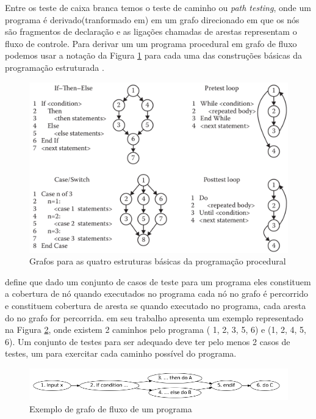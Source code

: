 \documentclass[dm,ppgcomp]{texfurg} %
\begin{document}
Entre os teste de caixa branca temos o teste de caminho ou \textit{path testing}, onde um programa é derivado(tranformado em) em um grafo direcionado em que os nós são fragmentos de declaração e as ligações chamadas de arestas representam o fluxo de controle. Para derivar um um programa procedural em grafo de fluxo podemos usar a notação da Figura \ref{fig:4estrutura_basica} para cada uma das construções básicas da programação estruturada \cite{jorgensen2016software}.

\begin{figure}[ht]
\centering
\includegraphics[scale=0.3]{imagens/const_basica_grafo.png}
\caption{Grafos para as quatro estruturas básicas da programação procedural}
\label{fig:4estrutura_basica}
\end{figure}

\cite{jorgensen2016software} define que dado um conjunto de casos de teste para um programa eles constituem a cobertura de nó quando executados no programa cada nó no grafo é percorrido e constituem cobertura de aresta se quando executado no programa, cada aresta do no grafo for percorrida. \cite{winikoff2014testability} em seu trabalho apresenta um exemplo representado na Figura \ref{fig:exemplo_grafo}, onde existem 2 caminhos pelo programa ( 1, 2, 3, 5, 6) e (1, 2, 4, 5, 6). Um conjunto de testes para ser adequado deve ter pelo menos 2 casos de testes, um para exercitar cada caminho possível do programa.

\begin{figure}[ht]
\centering
\includegraphics[scale=0.5]{imagens/exemplo_grafo.png}
\caption{Exemplo de grafo de fluxo de um programa}
\label{fig:exemplo_grafo}
\end{figure}
\end{document}
